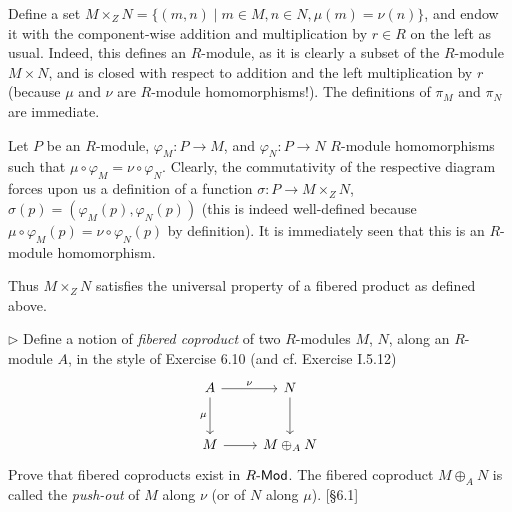 \begin{solution}
	Define a set $M \times_Z N = \{ (m, n) \mid m \in M, n \in N, \mu(m) = \nu(n) \}$, and endow it with the component-wise addition and multiplication by $r \in R$ on the left as usual. Indeed, this defines an $R$-module, as it is clearly a subset of the $R$-module $M \times N$, and is closed with respect to addition and the left multiplication by $r$ (because $\mu$ and $\nu$ are $R$-module homomorphisms!). The definitions of $\pi_M$ and $\pi_N$ are immediate.
	
	Let $P$ be an $R$-module, $\varphi_M: P \to M$, and $\varphi_N: P \to N$ $R$-module homomorphisms such that $\mu \circ \varphi_M = \nu \circ \varphi_N$. Clearly, the commutativity of the respective diagram forces upon us a definition of a function $\sigma: P \to M \times_Z N$, $\sigma(p) = (\varphi_M(p), \varphi_N(p))$ (this is indeed well-defined because $\mu \circ \varphi_M(p) = \nu \circ \varphi_N(p)$ by definition). It is immediately seen that this is an $R$-module homomorphism.
	
	Thus $M \times_Z N$ satisfies the universal property of a fibered product as defined above.
\end{solution}

\begin{problem}
	$\triangleright$ Define a notion of \emph{fibered coproduct} of two $R$-modules $M$, $N$, along an $R$-module $A$, in the style of Exercise 6.10 (and cf. Exercise I.5.12)
	\begin{equation*}
		\begin{tikzcd}[row sep=large]
			A
			\arrow[r, "\nu"]
			\arrow[d, "\mu"']
			& N
			\arrow[d] \\
			M
			\arrow[r]
			& M \oplus_A N
		\end{tikzcd}
	\end{equation*}
	Prove that fibered coproducts exist in $R\text{-}\mathsf{Mod}$. The fibered coproduct $M \oplus_A N$ is called the \emph{push-out} of $M$ along $\nu$ (or of $N$ along $\mu$). [\S 6.1]
\end{problem}

